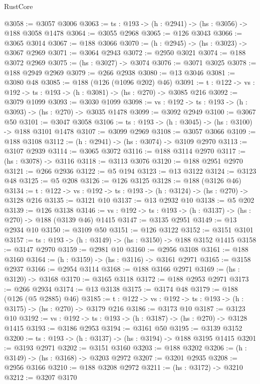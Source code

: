 \begin{lexlean}{RustCore}
\begin{coremodule}
@3058 := @3057 @3006
@3063 := {ts : @193} -> (h : @2941) -> (hs : @3056) -> @188 @3058 @1478
@3064 := @3055 @2968
@3065 := @126 @3043
@3066 := @3065 @3014
@3067 := @188 @3066
@3070 := (h : @2945) -> (hs : @3023) -> @3067 @2969
@3071 := @3064 @2943
@3072 := @2950 @3021
@3074 := @188 @3072 @2969
@3075 := (hs : @3027) -> @3074
@3076 := @3071 @3025
@3078 := @188 @2949 @2969
@3079 := @266 @2938
@3080 := @13 @3046
@3081 := @3080 @48
@3085 := @188 (@126 (@1096 @202) @46)
@3091 := {t : @122} -> {vs : @192} -> {ts : @193} -> (h : @3081) -> (hs : @270) -> @3085 @216
@3092 := @3079 @1099
@3093 := @3030 @1099
@3098 := {vs : @192} -> {ts : @193} -> (h : @3093) -> (hs : @270) -> @3035 @1478
@3099 := @3092 @2949
@3100 := @3067 @50
@3101 := @3047 @3058
@3106 := {ts : @193} -> (h : @3045) -> (hs : @3100) -> @188 @3101 @1478
@3107 := @3099 @2969
@3108 := @3057 @3066
@3109 := @188 @3108
@3112 := (h : @2941) -> (hs : @3074) -> @3109 @2970
@3113 := @3107 @2939
@3114 := @3065 @3072
@3116 := @188 @3114 @2970
@3117 := (hs : @3078) -> @3116
@3118 := @3113 @3076
@3120 := @188 @2951 @2970
@3121 := @266 @2936
@3122 := @5 @194
@3123 := @13 @3122
@3124 := @3123 @48
@3125 := @5 @208
@3126 := @126 @3125
@3128 := @188 (@3126 @46)
@3134 := {t : @122} -> {vs : @192} -> {ts : @193} -> (h : @3124) -> (hs : @270) -> @3128 @216
@3135 := @3121 @10
@3137 := @13 @2932 @10
@3138 := @5 @202
@3139 := @126 @3138
@3146 := {vs : @192} -> {ts : @193} -> (h : @3137) -> (hs : @270) -> @188 (@3139 @46) @1415
@3147 := @3135 @2951
@3149 := @13 @2934 @10
@3150 := @3109 @50
@3151 := @126 @3122
@3152 := @3151 @3101
@3157 := {ts : @193} -> (h : @3149) -> (hs : @3150) -> @188 @3152 @1415
@3158 := @3147 @2970
@3159 := @2981 @10
@3160 := @2956 @3108
@3161 := @188 @3160
@3164 := (h : @3159) -> (hs : @3116) -> @3161 @2971
@3165 := @3158 @2937
@3166 := @2954 @3114
@3168 := @188 @3166 @2971
@3169 := (hs : @3120) -> @3168
@3170 := @3165 @3118
@3172 := @188 @2953 @2971
@3173 := @266 @2934
@3174 := @13 @3138
@3175 := @3174 @48
@3179 := @188 (@126 (@5 @2885) @46)
@3185 := {t : @122} -> {vs : @192} -> {ts : @193} -> (h : @3175) -> (hs : @270) -> @3179 @216
@3186 := @3173 @10
@3187 := @3123 @10
@3192 := {vs : @192} -> {ts : @193} -> (h : @3187) -> (hs : @270) -> @3128 @1415
@3193 := @3186 @2953
@3194 := @3161 @50
@3195 := @3139 @3152
@3200 := {ts : @193} -> (h : @3137) -> (hs : @3194) -> @188 @3195 @1415
@3201 := @3193 @2971
@3202 := @3151 @3160
@3203 := @188 @3202
@3206 := (h : @3149) -> (hs : @3168) -> @3203 @2972
@3207 := @3201 @2935
@3208 := @2956 @3166
@3210 := @188 @3208 @2972
@3211 := (hs : @3172) -> @3210
@3212 := @3207 @3170

\end{coremodule}
\end{lexlean}
